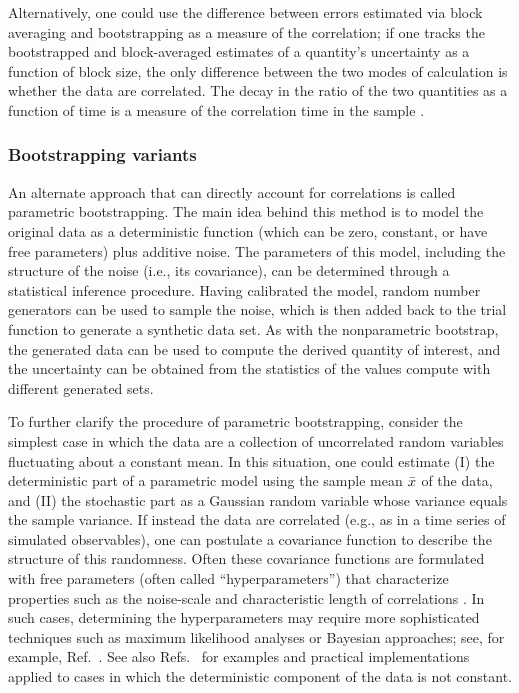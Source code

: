 Alternatively, one could use the difference between errors estimated via block averaging and bootstrapping as a measure of the correlation; if one tracks the bootstrapped and block-averaged estimates of a quantity's uncertainty as a function of block size, the only difference between the two modes of calculation is whether the data are correlated.  The decay in the ratio of the two quantities as a function of time is a measure of the correlation time in the sample \cite{Romo2011}.

\subsubsection{Bootstrapping variants}

An alternate approach that can directly account for correlations is called parametric bootstrapping.  The main idea behind this method is to model the original data as a deterministic function (which can be zero, constant, or have free parameters) plus additive noise.  The parameters of this model, including the structure of the noise (i.e., its covariance), can be determined through a statistical inference procedure.  Having calibrated the model, random number generators can be used to sample the noise, which is then added back to the trial function to generate a synthetic data set.   As with the nonparametric bootstrap, the generated data can be used to compute the derived quantity of interest, and the uncertainty can be obtained from the statistics of the values compute with different generated sets.

To further clarify the procedure of parametric bootstrapping, consider the simplest case in which the data are a collection of uncorrelated random variables fluctuating about a constant mean.  In this situation, one could estimate (I) the deterministic part of a parametric model using the sample mean $\bar{x}$ of the data, and (II) the stochastic part as a Gaussian random variable whose variance equals the sample variance.  If instead the data are correlated (e.g., as in a time series of simulated observables),  one can postulate a covariance function to describe the structure of this randomness.  Often these covariance functions are formulated with free parameters (often called ``hyperparameters'') that characterize properties such as the noise-scale and characteristic length of correlations \cite{Rasmussen}.  In such cases, determining the hyperparameters may require more sophisticated techniques such as maximum likelihood analyses or Bayesian approaches; see, for example, Ref.~\cite{Rasmussen}.  See also Refs.~\cite{patrone1,patrone2,patrone3} for examples and practical implementations applied to cases in which the deterministic component of the data is not constant.

